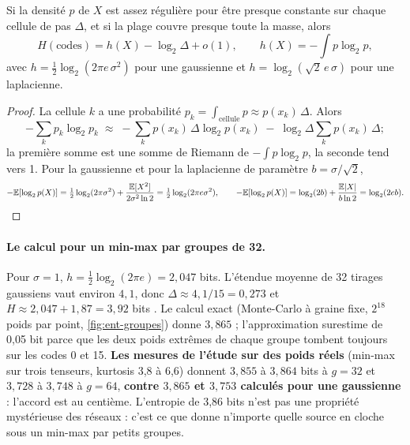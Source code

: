 \begin{proposition}\label{prop:ent-haute-resolution}
Si la densité $p$ de $X$ est assez régulière pour être presque constante sur chaque cellule de pas $\Delta$, et si la plage couvre presque toute la masse, alors
\begin{equation}\label{eq:ent-haute-resolution}
H(\text{codes}) = h(X) - \log_2 \Delta + o(1), \qquad h(X) = -\int p \log_2 p,
\end{equation}
avec $h = \tfrac12 \log_2(2\pi e\,\sigma^2)$ pour une gaussienne et $h = \log_2(\sqrt2\, e\, \sigma)$ pour une laplacienne.
\end{proposition}

\begin{proof}
La cellule $k$ a une probabilité $p_k = \int_{\text{cellule}} p \approx p(x_k)\,\Delta$. Alors
\[
-\sum_k p_k \log_2 p_k \;\approx\; -\sum_k p(x_k)\,\Delta \log_2 p(x_k) \;-\; \log_2\Delta \sum_k p(x_k)\,\Delta ;
\]
la première somme est une somme de Riemann de $-\int p \log_2 p$, la seconde tend vers 1. Pour la gaussienne et pour la laplacienne de paramètre $b = \sigma/\sqrt2$,
\[
-\mathbb{E}[\log_2 p(X)] = \tfrac12\log_2(2\pi\sigma^2) + \frac{\mathbb{E}[X^2]}{2\sigma^2 \ln 2} = \tfrac12\log_2(2\pi e\sigma^2),
\qquad
-\mathbb{E}[\log_2 p(X)] = \log_2(2b) + \frac{\mathbb{E}|X|}{b\ln 2} = \log_2(2 e b).
\]
\end{proof}

\paragraph{Le calcul pour un min-max par groupes de 32.} Pour $\sigma = 1$, $h = \tfrac12\log_2(2\pi e) = 2{,}047$ bits. L'étendue moyenne de 32 tirages gaussiens vaut environ $4{,}1$, donc $\Delta \approx 4{,}1/15 = 0{,}273$ et $H \approx 2{,}047 + 1{,}87 = 3{,}92$ bits \calc. Le calcul exact (Monte-Carlo à graine fixe, $2^{18}$ poids par point, \cref{fig:ent-groupes}) donne $3{,}865$ ; l'approximation surestime de 0,05 bit parce que les deux poids extrêmes de chaque groupe tombent toujours sur les codes 0 et 15. \textbf{Les mesures de l'étude sur des poids réels} (min-max sur trois tenseurs, kurtosis 3,8 à 6,6) donnent $3{,}855$ à $3{,}864$ bits à $g = 32$ et $3{,}728$ à $3{,}748$ à $g = 64$, \textbf{contre $3{,}865$ et $3{,}753$ calculés pour une gaussienne} : l'accord est au centième. L'entropie de 3,86 bits n'est pas une propriété mystérieuse des réseaux : c'est ce que donne n'importe quelle source en cloche sous un min-max par petits groupes.

